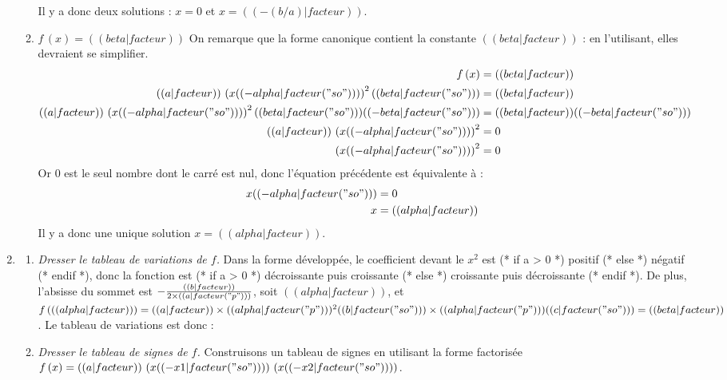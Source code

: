 \begin{enumerate}
\begin{enumerate}
Il y a donc deux solutions : $x=0$ et $x=(( -(b/a)|facteur ))$.
\item $f\,(x)=(( beta|facteur ))$ On remarque que la forme canonique contient la constante $(( beta|facteur ))$ : en l'utilisant, elles devraient se simplifier.
\begin{align*}
f\,(x) &= (( beta|facteur)) \\
(( a|facteur )) \,\left( x (( -alpha|facteur("so") )) \right)^2 (( beta|facteur("so") )) &= (( beta|facteur ))\\
(( a|facteur )) \,\left( x (( -alpha|facteur("so") )) \right)^2 (( beta|facteur("so") )) (( -beta|facteur("so") )) &= (( beta|facteur )) (( -beta|facteur("so") ))\\
(( a|facteur )) \,\left( x (( -alpha|facteur("so") )) \right)^2 &= 0\\
\left( x (( -alpha|facteur("so") )) \right)^2 &= 0\\
\end{align*}
Or $0$ est le seul nombre dont le carré est nul, donc l'équation précédente est équivalente à :
\begin{align*}
x (( -alpha|facteur("so") )) &= 0\\
x &= (( alpha|facteur )) \\
\end{align*}
Il y a donc une unique solution $x=(( alpha|facteur ))$.
\end{enumerate}
\item
\begin{enumerate}
\item \emph{Dresser le tableau de variations de $f$.} Dans la forme développée, le coefficient devant le $x^2$ est 
(* if a > 0 *) positif (* else *) négatif (* endif *),
donc la fonction est 
(* if a > 0 *) décroissante puis croissante (* else *) croissante puis décroissante (* endif *).
De plus, l'absisse du sommet est $-\frac{(( b|facteur ))}{2\times(( a|facteur("p") ))}$, soit $(( alpha|facteur ))$, et
$f\,( (( alpha|facteur )) )=(( a|facteur ))\times(( alpha|facteur("p") ))^2 (( b|facteur("so") ))\times (( alpha|facteur("p") )) (( c|facteur("so") ))=(( beta|facteur ))$.
Le tableau de variations est donc :
\begin{center}
\end{center}
\item \emph{Dresser le tableau de signes de $f$.} Construisons un tableau de signes en utilisant la forme factorisée $f\,(x)=(( a|facteur )) \,\left(x (( -x1|facteur("so") ))\right) \, \left(x (( -x2|facteur("so") ))\right)$.


\end{enumerate}
\end{enumerate}
